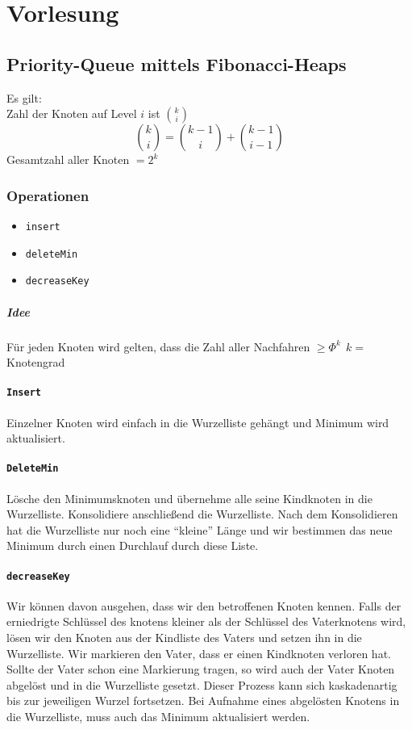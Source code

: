 \chapter{Vorlesung}
\section{Priority-Queue mittels Fibonacci-Heaps}
Es gilt:\\
Zahl der Knoten auf Level $i$ ist $\binom{k}{i}$
\[  \binom{k}{i} = \binom{k-1}{i} + \binom{k-1}{i-1} \]
Gesamtzahl aller Knoten $=2^k$
\subsection{Operationen}
\begin{itemize}
	\item \texttt{insert}
	\item \texttt{deleteMin}
	\item \texttt{decreaseKey}
\end{itemize}
\paragraph{Idee}
Für jeden Knoten wird gelten, dass die Zahl aller Nachfahren $\geq \Phi^k~~k=$Knotengrad
\subsubsection{\texttt{Insert}}
Einzelner Knoten wird einfach in die Wurzelliste gehängt und Minimum wird aktualisiert.
\subsubsection{\texttt{DeleteMin}}
Lösche den Minimumsknoten und übernehme alle seine Kindknoten in die Wurzelliste. Konsolidiere anschließend die Wurzelliste. Nach dem Konsolidieren hat die Wurzelliste nur noch eine "`kleine"' Länge und wir bestimmen das neue Minimum durch einen Durchlauf durch diese Liste.
\subsubsection{\texttt{decreaseKey}}
Wir können davon ausgehen, dass wir den betroffenen Knoten kennen. Falls der erniedrigte Schlüssel des knotens kleiner als der Schlüssel des Vaterknotens wird, lösen wir den Knoten aus der Kindliste des Vaters und setzen ihn in die Wurzelliste. Wir markieren den Vater, dass er einen Kindknoten verloren hat. Sollte der Vater schon eine Markierung tragen, so wird auch der Vater Knoten abgelöst und in die Wurzelliste gesetzt. Dieser Prozess kann sich kaskadenartig bis zur jeweiligen Wurzel fortsetzen. Bei Aufnahme eines abgelösten Knotens in die Wurzelliste, muss auch das Minimum aktualisiert werden.
